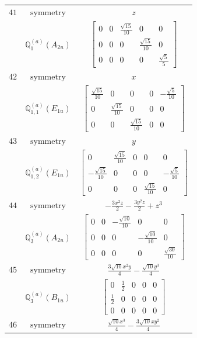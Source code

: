 \documentclass[fleqn,8pt,landscape]{jsarticle}
\begin{document}
\begin{longtable}{ccc}
$ 41 $ & $ \text{symmetry} $ & $ z $ \\
$  $ & $ \mathbb{Q}_{1}^{(a)}(A_{2u}) $ & $ \begin{bmatrix} 0 & 0 & \frac{\sqrt{15}}{10} & 0 & 0 \\ 0 & 0 & 0 & \frac{\sqrt{15}}{10} & 0 \\ 0 & 0 & 0 & 0 & \frac{\sqrt{5}}{5} \end{bmatrix} $ \\ \hline
$ 42 $ & $ \text{symmetry} $ & $ x $ \\
$  $ & $ \mathbb{Q}_{1,1}^{(a)}(E_{1u}) $ & $ \begin{bmatrix} \frac{\sqrt{15}}{10} & 0 & 0 & 0 & - \frac{\sqrt{5}}{10} \\ 0 & \frac{\sqrt{15}}{10} & 0 & 0 & 0 \\ 0 & 0 & \frac{\sqrt{15}}{10} & 0 & 0 \end{bmatrix} $ \\ \hline
$ 43 $ & $ \text{symmetry} $ & $ y $ \\
$  $ & $ \mathbb{Q}_{1,2}^{(a)}(E_{1u}) $ & $ \begin{bmatrix} 0 & \frac{\sqrt{15}}{10} & 0 & 0 & 0 \\ - \frac{\sqrt{15}}{10} & 0 & 0 & 0 & - \frac{\sqrt{5}}{10} \\ 0 & 0 & 0 & \frac{\sqrt{15}}{10} & 0 \end{bmatrix} $ \\ \hline
$ 44 $ & $ \text{symmetry} $ & $ - \frac{3 x^{2} z}{2} - \frac{3 y^{2} z}{2} + z^{3} $ \\
$  $ & $ \mathbb{Q}_{3}^{(a)}(A_{2u}) $ & $ \begin{bmatrix} 0 & 0 & - \frac{\sqrt{10}}{10} & 0 & 0 \\ 0 & 0 & 0 & - \frac{\sqrt{10}}{10} & 0 \\ 0 & 0 & 0 & 0 & \frac{\sqrt{30}}{10} \end{bmatrix} $ \\ \hline
$ 45 $ & $ \text{symmetry} $ & $ \frac{3 \sqrt{10} x^{2} y}{4} - \frac{\sqrt{10} y^{3}}{4} $ \\
$  $ & $ \mathbb{Q}_{3}^{(a)}(B_{1u}) $ & $ \begin{bmatrix} 0 & \frac{1}{2} & 0 & 0 & 0 \\ \frac{1}{2} & 0 & 0 & 0 & 0 \\ 0 & 0 & 0 & 0 & 0 \end{bmatrix} $ \\ \hline
$ 46 $ & $ \text{symmetry} $ & $ \frac{\sqrt{10} x^{3}}{4} - \frac{3 \sqrt{10} x y^{2}}{4} $ \\

\end{longtable}
\end{document}
